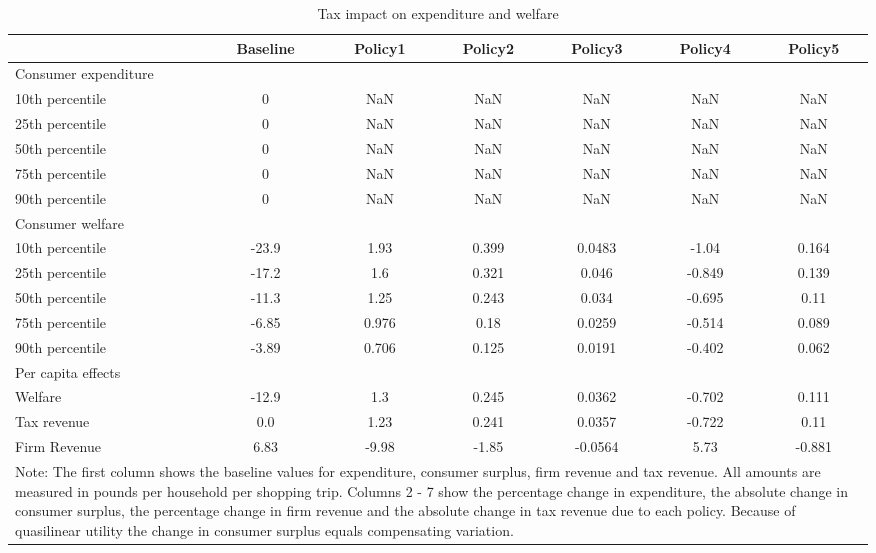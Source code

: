 \documentclass[11pt]{article}
\begin{document}
\begin{table}[h]
\caption{Tax impact on expenditure and welfare}
\label{table:tax impact welfare}
\begin{center}
\begin{tabular}{lcccccc} \hline \hline
 & Baseline & Policy1 & Policy2 & Policy3 & Policy4 & Policy5 \\ \hline
Consumer expenditure & & & & & & \\
10th percentile &0 &NaN &NaN &NaN &NaN &NaN \\
25th percentile &0 &NaN &NaN &NaN &NaN &NaN \\
50th percentile &0 &NaN &NaN &NaN &NaN &NaN \\
75th percentile &0 &NaN &NaN &NaN &NaN &NaN \\
90th percentile &0 &NaN &NaN &NaN &NaN &NaN \\
\hline 
Consumer welfare & & & & & & \\
10th percentile &-23.9 &1.93 &0.399 &0.0483 &-1.04 &0.164 \\
25th percentile &-17.2 &1.6 &0.321 &0.046 &-0.849 &0.139 \\
50th percentile &-11.3 &1.25 &0.243 &0.034 &-0.695 &0.11 \\
75th percentile &-6.85 &0.976 &0.18 &0.0259 &-0.514 &0.089 \\
90th percentile &-3.89 &0.706 &0.125 &0.0191 &-0.402 &0.062 \\
\hline 
Per capita effects & & & & & & \\
Welfare & -12.9 &1.3 &0.245 &0.0362 &-0.702 &0.111 \\
Tax revenue & 0.0 &1.23 &0.241 &0.0357 &-0.722 &0.11 \\
Firm Revenue & 6.83 &-9.98 &-1.85 &-0.0564 &5.73 &-0.881 \\
 \hline \hline
\multicolumn{7}{p{0.8 \textwidth}}{Note: The first column shows the baseline values for expenditure, consumer surplus, firm revenue and tax revenue. All amounts are measured in pounds per household per shopping trip. Columns 2 - 7 show the percentage change in expenditure, the absolute change in consumer surplus, the percentage change in firm revenue and the absolute change in tax revenue due to each policy. Because of quasilinear utility the change in consumer surplus equals compensating variation.}
\end{tabular}
\end{center}
\end{table}
\end{document}
